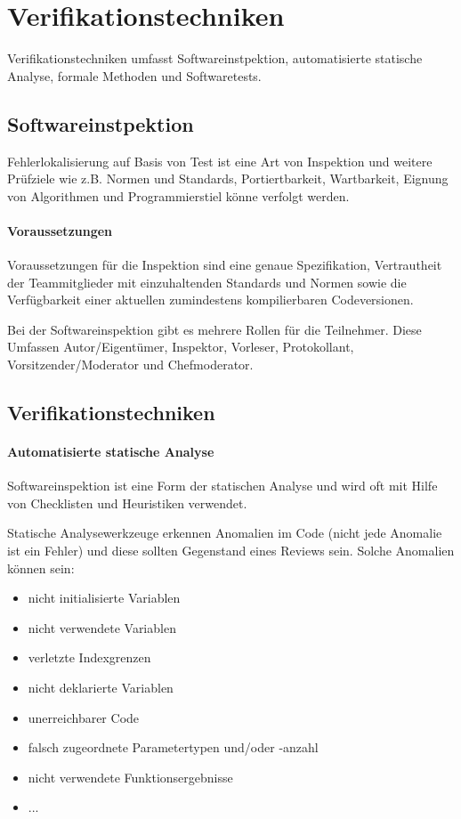 
\section{Verifikationstechniken}
Verifikationstechniken umfasst Softwareinstpektion, automatisierte statische Analyse, formale Methoden und Softwaretests.

\subsection{Softwareinstpektion}
Fehlerlokalisierung auf Basis von Test ist eine Art von Inspektion und weitere Prüfziele wie z.B. Normen und Standards, Portiertbarkeit, Wartbarkeit, Eignung von Algorithmen und Programmierstiel könne verfolgt werden.

\paragraph{Voraussetzungen}
Voraussetzungen für die Inspektion sind eine genaue Spezifikation, Vertrautheit der Teammitglieder mit einzuhaltenden Standards und Normen sowie die Verfügbarkeit einer aktuellen zumindestens kompilierbaren Codeversionen.

Bei der Softwareinspektion gibt es mehrere Rollen für die Teilnehmer. Diese Umfassen Autor/Eigentümer, Inspektor, Vorleser, Protokollant, Vorsitzender/Moderator und Chefmoderator.


\subsection{Verifikationstechniken}
\paragraph{Automatisierte statische Analyse}
Softwareinspektion ist eine Form der statischen Analyse und wird oft mit Hilfe von Checklisten und Heuristiken verwendet. 

Statische Analysewerkzeuge erkennen Anomalien im Code (nicht jede Anomalie ist ein Fehler) und diese sollten Gegenstand eines Reviews sein. Solche Anomalien können sein:

\begin{itemize}
\item nicht initialisierte Variablen
\item nicht verwendete Variablen
\item verletzte Indexgrenzen
\item nicht deklarierte Variablen
\item unerreichbarer Code
\item falsch zugeordnete Parametertypen und/oder -anzahl
\item nicht verwendete Funktionsergebnisse 
\item ...
\end{itemize}

